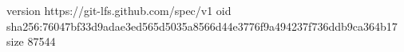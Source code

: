 version https://git-lfs.github.com/spec/v1
oid sha256:76047bf33d9adae3ed565d5035a8566d44e3776f9a494237f736ddb9ca364b17
size 87544

